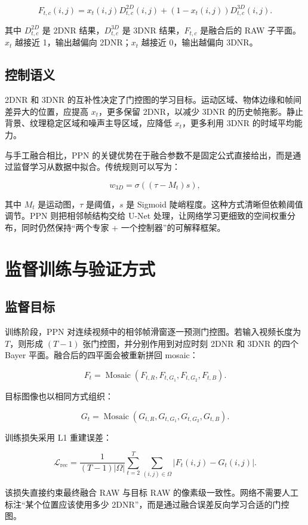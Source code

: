 \documentclass[UTF8,zihao=-4]{ctexart}
\begin{document}
\[
F_{t,c}(i,j)
=x_t(i,j)D^{2D}_{t,c}(i,j)
+\left(1-x_t(i,j)\right)D^{3D}_{t,c}(i,j).
\]

其中 $D^{2D}_{t,c}$ 是 2DNR 结果，$D^{3D}_{t,c}$ 是 3DNR 结果，$F_{t,c}$ 是融合后的 RAW 子平面。$x_t$ 越接近 1，输出越偏向 2DNR；$x_t$ 越接近 0，输出越偏向 3DNR。

\subsection{控制语义}

2DNR 和 3DNR 的互补性决定了门控图的学习目标。运动区域、物体边缘和帧间差异大的位置，应提高 $x_t$，更多保留 2DNR，以减少 3DNR 的历史帧拖影。静止背景、纹理稳定区域和噪声主导区域，应降低 $x_t$，更多利用 3DNR 的时域平均能力。

与手工融合相比，PPN 的关键优势在于融合参数不是固定公式直接给出，而是通过监督学习从数据中拟合。传统规则可以写为：

\[
w_{3D}=\sigma((\tau-M_t)s),
\]

其中 $M_t$ 是运动图，$\tau$ 是阈值，$s$ 是 Sigmoid 陡峭程度。这种方式清晰但依赖阈值调节。PPN 则把相邻帧结构交给 U-Net 处理，让网络学习更细致的空间权重分布，同时仍然保持“两个专家 + 一个控制器”的可解释框架。

\section{监督训练与验证方式}

\subsection{监督目标}

训练阶段，PPN 对连续视频中的相邻帧滑窗逐一预测门控图。若输入视频长度为 $T$，则形成 $(T-1)$ 张门控图，并分别作用到对应时刻 2DNR 和 3DNR 的四个 Bayer 平面。融合后的四平面会被重新拼回 mosaic：

\[
F_t=\operatorname{Mosaic}(F_{t,R},F_{t,G_1},F_{t,G_2},F_{t,B}).
\]

目标图像也以相同方式组织：

\[
G_t=\operatorname{Mosaic}(G_{t,R},G_{t,G_1},G_{t,G_2},G_{t,B}).
\]

训练损失采用 L1 重建误差：

\[
\mathcal{L}_{\mathrm{rec}}
=\frac{1}{(T-1)|\Omega|}
\sum_{t=2}^{T}\sum_{(i,j)\in\Omega}
\left|F_t(i,j)-G_t(i,j)\right|.
\]

该损失直接约束最终融合 RAW 与目标 RAW 的像素级一致性。网络不需要人工标注“某个位置应该使用多少 2DNR”，而是通过融合误差反向学习合适的门控图。
\end{document}
